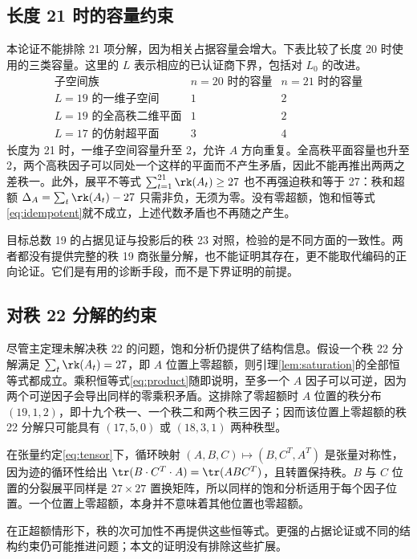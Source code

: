 \documentclass[11pt,a4paper]{article}
\begin{document}
\subsection{长度 21 时的容量约束}

本论证不能排除 21 项分解，因为相关占据容量会增大。下表比较了长度 20 时使用的三类容量。这里的 $L$ 表示相应的已认证商下界，包括对 $L_0$ 的改进。
\[
  \begin{array}{c|cc}
    \text{子空间族}&n=20\text{ 时的容量}&n=21\text{ 时的容量}\\\hline
    L=19\text{ 的一维子空间}&1&2\\
    L=19\text{ 的全高秩二维平面}&1&2\\
    L=17\text{ 的仿射超平面}&3&4
  \end{array}
\]
长度为 21 时，一维子空间容量升至 2，允许 $A$ 方向重复。全高秩平面容量也升至 2，两个高秩因子可以同处一个这样的平面而不产生矛盾，因此不能再推出两两之差秩一。此外，展平不等式 $\sum_{t=1}^{21}\rk(A_t)\ge27$ 也不再强迫秩和等于 27：秩和超额 $\Delta_A=\sum_t\rk(A_t)-27$ 只需非负，无须为零。没有零超额，饱和恒等式\eqref{eq:idempotent}就不成立，上述代数矛盾也不再随之产生。

目标总数 19 的占据见证与投影后的秩 23 对照，检验的是不同方面的一致性。两者都没有提供完整的秩 19 商张量分解，也不能证明其存在，更不能取代编码的正向论证。它们是有用的诊断手段，而不是下界证明的前提。

\subsection{对秩 22 分解的约束}

尽管主定理未解决秩 22 的问题，饱和分析仍提供了结构信息。假设一个秩 22 分解满足 $\sum_t\rk(A_t)=27$，即 $A$ 位置上零超额，则引理\ref{lem:saturation}的全部恒等式都成立。乘积恒等式\eqref{eq:product}随即说明，至多一个 $A$ 因子可以可逆，因为两个可逆因子会导出同样的零乘积矛盾。这排除了零超额时 $A$ 位置的秩分布 $(19,1,2)$，即十九个秩一、一个秩二和两个秩三因子；因而该位置上零超额的秩 22 分解只可能具有 $(17,5,0)$ 或 $(18,3,1)$ 两种秩型。

在张量约定\eqref{eq:tensor}下，循环映射 $(A,B,C)\mapsto(B,C^T,A^T)$ 是张量对称性，因为迹的循环性给出 $\tr(B\cdot C^T\cdot A)=\tr(ABC^T)$，且转置保持秩。$B$ 与 $C$ 位置的分裂展平同样是 $27\times27$ 置换矩阵，所以同样的饱和分析适用于每个因子位置。一个位置上零超额，本身并不意味着其他位置也零超额。

在正超额情形下，秩的次可加性不再提供这些恒等式。更强的占据论证或不同的结构约束仍可能推进问题；本文的证明没有排除这些扩展。
\end{document}
